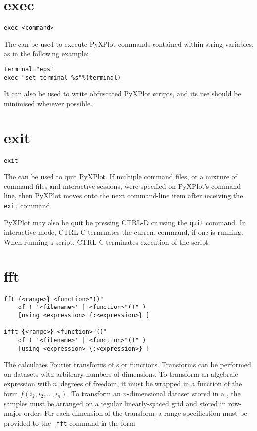 \section{exec}

\begin{verbatim}
exec <command>
\end{verbatim}

The  can be used to execute PyXPlot commands contained within
string variables, as in the following example:

\begin{verbatim}
terminal="eps"
exec "set terminal %s"%(terminal)
\end{verbatim}

\noindent It can also be used to write obfuscated PyXPlot scripts, and its use
should be minimised wherever possible.


\section{exit}

\begin{verbatim}
exit
\end{verbatim}

The  can be used to quit PyXPlot. If multiple command files,
or a mixture of command files and interactive sessions, were specified on
PyXPlot's command line, then PyXPlot moves onto the next command-line item
after receiving the {\tt exit} command.

PyXPlot may also be quit be pressing CTRL-D or using the {\tt quit} command. In
interactive mode, CTRL-C terminates the current command, if one is running.
When running a script, CTRL-C terminates execution of the script.


\section{fft}

\begin{verbatim}
fft {<range>} <function>"()"
    of ( '<filename>' | <function>"()" )
    [using <expression> {:<expression>} ]

ifft {<range>} <function>"()"
    of ( '<filename>' | <function>"()" )
    [using <expression> {:<expression>} ]
\end{verbatim}

The  calculates Fourier transforms of \datafile s or functions.
Transforms can be performed on datasets with arbitrary numbers of dimensions.
To transform an algebraic expression with $n$~degrees of freedom, it must be
wrapped in a function of the form $f(i_2,i_2,\ldots,i_n)$. To transform an
$n$-dimensional dataset stored in a \datafile, the samples must be arranged on
a regular linearly-spaced grid and stored in row-major order.  For each
dimension of the transform, a range specification must be provided to the {\tt
fft} command in the form

